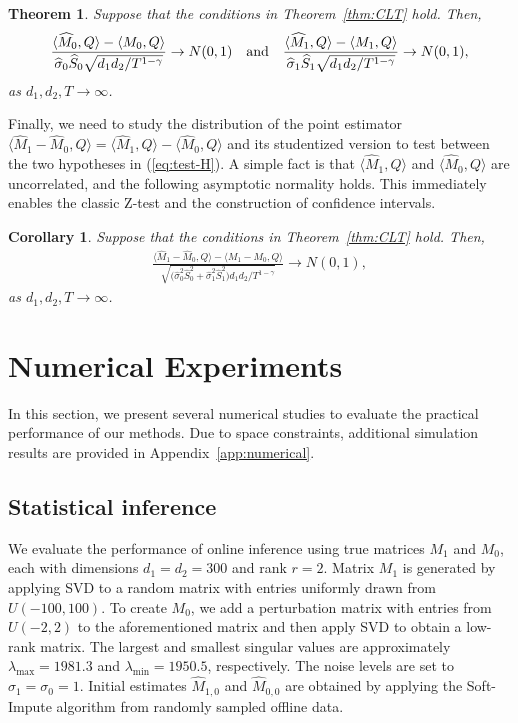 \documentclass[12pt]{article}
\def\hat{\widehat}
\newtheorem{Theorem}{Theorem}
\theoremstyle{plain}
\newtheorem{Corollary}{Corollary}
\begin{document}
\begin{Theorem}
\label{thm:studentized-CLT}
Suppose that the conditions in Theorem~\ref{thm:CLT} hold. Then,  
\begin{align*}
    \frac{\langle \hat M_0, Q\rangle - \langle M_0, Q\rangle}{\hat\sigma_0 \widehat{S}_0 \sqrt{d_1d_2/T^{1-\gamma}}}\rightarrow N(0,1)\quad {\rm and}\quad 
    \frac{\langle \hat M_1, Q\rangle - \langle M_1, Q\rangle}{\hat\sigma_1 \widehat{S}_1 \sqrt{d_1d_2/T^{1-\gamma}}}\rightarrow N(0,1),
\end{align*}
as $d_1,d _2, T\to\infty$.  
\end{Theorem}

Finally,  we need to study the distribution of the point estimator $\langle \hat M_1-\hat M_0, Q\rangle=\langle \hat M_1, Q\rangle-\langle \hat M_0, Q\rangle$ and its studentized version to test between the two hypotheses in (\ref{eq:test-H}). A simple fact is that $\langle \hat M_1, Q\rangle$ and $\langle \hat M_0, Q\rangle$ are uncorrelated, and the following asymptotic normality holds. This immediately enables the classic Z-test and the construction of confidence intervals. 


\begin{Corollary}\label{cor:m1-m0}
Suppose that the conditions in Theorem~\ref{thm:CLT} hold. Then, 
 \begin{align*}
      \frac{\langle \hat M_1 -\hat M_0, Q\rangle - \langle M_1-M_0, Q\rangle}{\sqrt{\big(\hat\sigma_0^2\widehat{S}_0^2+\hat\sigma_1^2\widehat{S}_1^2 \big)d_1d_2/T^{1-\gamma}}} \longrightarrow N(0,1),
 \end{align*}
as $d_1,d _2, T\to\infty$. 
\end{Corollary}


\section{Numerical Experiments}\label{sec:simulation}
In this section, we present several numerical studies to evaluate the practical performance of our methods.  Due to space constraints,  additional simulation results are provided in Appendix~\ref{app:numerical}.  

\subsection{Statistical inference}
We evaluate the performance of online inference using true matrices $M_1$ and $M_0$, each with dimensions $d_1=d_2=300$ and rank $r=2$. Matrix $M_1$ is generated by applying SVD to a random matrix with entries uniformly drawn from $U(-100,100)$. To create $M_0$, we add a perturbation matrix with entries from $U(-2,2)$ to the aforementioned matrix and then apply SVD to obtain a low-rank matrix. The largest and smallest singular values are approximately $\lambda_{\max}=1981.3$ and $\lambda_{\min}=1950.5$, respectively. The noise levels are set to $\sigma_1=\sigma_0=1$. Initial estimates $\widehat{M}_{1,0}$ and $\widehat{M}_{0,0}$ are obtained by applying the Soft-Impute algorithm \citep{mazumder2010spectral} from randomly sampled offline data.
\end{document}
